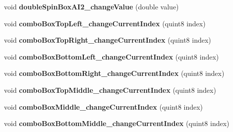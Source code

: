 \begin{DoxyCompactItemize}
\item 
\mbox{\label{class_setting_window_a8fff7b4c7edf48b470f6218a081e0112}} 
void {\bfseries double\+Spin\+Box\+A\+I2\+\_\+change\+Value} (double value)
\item 
\mbox{\label{class_setting_window_acc0a1af1357b1043c4ce4cfe7358d0e6}} 
void {\bfseries combo\+Box\+Top\+Left\+\_\+change\+Current\+Index} (quint8 index)
\item 
\mbox{\label{class_setting_window_a7ac6f02b9002a20e8ab2451fce754285}} 
void {\bfseries combo\+Box\+Top\+Right\+\_\+change\+Current\+Index} (quint8 index)
\item 
\mbox{\label{class_setting_window_a3611b08fd46875886e8a50713ea15a99}} 
void {\bfseries combo\+Box\+Bottom\+Left\+\_\+change\+Current\+Index} (quint8 index)
\item 
\mbox{\label{class_setting_window_ae7436a12721f638f135877c685074e29}} 
void {\bfseries combo\+Box\+Bottom\+Right\+\_\+change\+Current\+Index} (quint8 index)
\item 
\mbox{\label{class_setting_window_a9fd98824dd1d90a6aaa8aee473c7d978}} 
void {\bfseries combo\+Box\+Top\+Middle\+\_\+change\+Current\+Index} (quint8 index)
\item 
\mbox{\label{class_setting_window_a76b40a817f5b8db8dc6a40d22c454c96}} 
void {\bfseries combo\+Box\+Middle\+\_\+change\+Current\+Index} (quint8 index)
\item 
\mbox{\label{class_setting_window_adc1e1a8963c3f1203260c8e332bd4cb5}} 
void {\bfseries combo\+Box\+Bottom\+Middle\+\_\+change\+Current\+Index} (quint8 index)
\end{DoxyCompactItemize}
